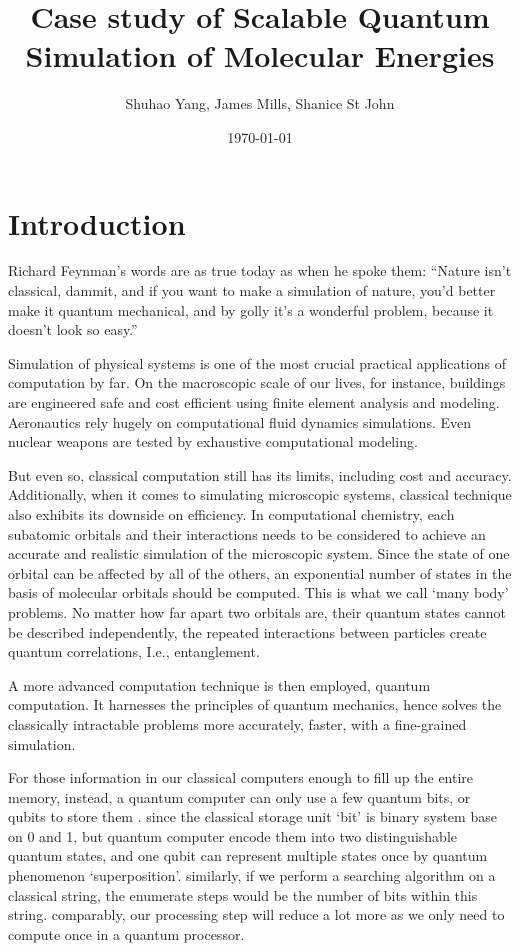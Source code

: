 \documentclass[12pt]{article}
\begin{document}
\title{Case study of Scalable Quantum Simulation of Molecular Energies}
\author{Shuhao Yang, James Mills, Shanice St John}
\date{\today}
\maketitle
\section{Introduction}
Richard Feynman’s words are as true today as when he spoke them: “Nature isn't classical, dammit, and if you want to make a simulation of nature, you'd better make it quantum mechanical, and by golly it's a wonderful problem, because it doesn't look so easy.”

Simulation of physical systems is one of the most crucial practical applications of computation by far.  On the macroscopic scale of our lives, for instance, buildings are engineered safe and cost efficient using ﬁnite element analysis and modeling. Aeronautics rely hugely on computational ﬂuid dynamics simulations. Even nuclear weapons are tested by exhaustive computational modeling.

But even so, classical computation still has its limits, including cost and accuracy. Additionally, when it comes to simulating microscopic systems, classical technique also exhibits its downside on efficiency. In computational chemistry, each subatomic orbitals and their interactions needs to be considered to achieve an accurate and realistic simulation of the microscopic system. Since the state of one orbital can be affected by all of the others, an exponential number of states in the basis of molecular orbitals should be computed. This is what we call ‘many body’ problems. No matter how far apart two orbitals are, their quantum states cannot be described independently, the repeated interactions between particles create quantum correlations, I.e., entanglement.

A more advanced computation technique is then employed, quantum computation. It harnesses the principles of quantum mechanics, hence solves the classically intractable problems more accurately, faster, with a fine-grained simulation.

For those information in our classical computers enough to fill up the entire memory, instead, a quantum computer can only use a few quantum bits, or qubits to store them \cite{trabesinger2012quantum}. since the classical storage unit ‘bit’ is binary system base on 0 and 1, but quantum computer encode them into two distinguishable quantum states, and one qubit can represent multiple states once by quantum phenomenon ‘superposition’. similarly, if we perform a searching algorithm on a classical string, the enumerate steps would be the number of bits within this string. comparably, our processing step will reduce a lot more as we only need to compute once in a quantum processor.
\end{document}
